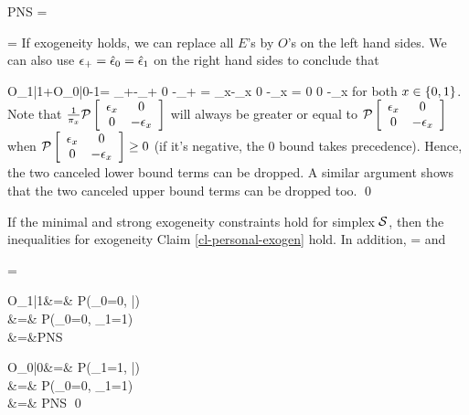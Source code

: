 \beq
PNS =
\eeq

\beq
\left[
\begin{array}{c}
E_{1|1}
\\
\\
E_{0|0}
\\
\\
O_{1,1}+ O_{0,0}
\\
\\
E_{1|1} + E_{0|0}
-O_{1,1}- O_{0,0}
\end{array}
\right]
=
\eeq
If exogeneity holds,
we can replace all $E$'s
by $O$'s on the left hand sides.
We can also use $\epsilon_+=\hat{\epsilon}_0=
\hat{\epsilon}_1$
on the right hand sides to conclude that

\beq
O_{1|1}+O_{0|0}-1=
\Pmat{\eps_+}
{\eps_+-\eps_+}
{0}
{-\eps_+}
=
{\hat{\eps}_x-\hat{\eps}_x}
{0}
{-\hat{\eps}_x}
=
{0}
{0}
{-\eps_x}
\eeq
for both $x\in\{0,1\}$.
Note that
$\frac{1}{\pi_x}{\cal P}\left[ \begin{array}{cc}\epsilon_x&0\\0&-\epsilon_x \end{array}\right]$
will always be greater or equal to
${\cal P}\left[ \begin{array}{cc}\epsilon_x&0\\0&-\epsilon_x \end{array}\right]$
when ${\cal P}\left[ \begin{array}{cc}\epsilon_x&0\\0&-\epsilon_x \end{array}\right]\geq 0$ (if it's
negative, the 0 bound takes precedence). Hence,
the two canceled lower bound terms
can be dropped.
A similar argument shows that the
two canceled upper bound terms
can be dropped too.
\qed



\begin{claim}
If the minimal and
strong exogeneity constraints
 hold for simplex ${\cal S}$,
then the inequalities
for exogeneity Claim \ref{cl-personal-exogen}
hold.
In addition,
\beq
\PN =
\eeq
and

\beq
\PS =
\eeq
\end{claim}
\proof
\beqa
\PN *O_{1|1}&=&
P(\rvy_0=0, |)
\\
&=&
P(\rvy_0=0, \rvy_1=1)
\\
&=&PNS
\eeqa

\beqa
\PS *O_{0|0}&=&
P(\rvy_1=1, |)
\\
&=&
P(\rvy_0=0, \rvy_1=1)
\\
&=& PNS
\eeqa
\qed


